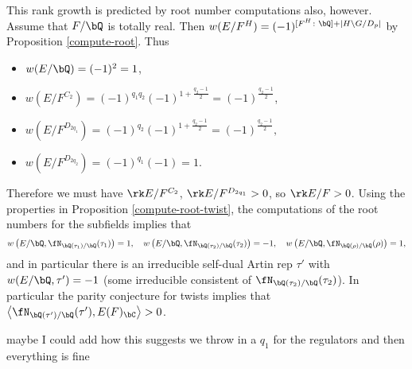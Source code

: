 \begin{example}[Dihedral]
    This rank growth is predicted by root number computations also, however. Assume that $F / \bQ$ is totally real. Then $w(E / F^H) = (-1)^{[F^H \colon \bQ] + | H \backslash G / D_p|}$ by Proposition \ref{compute-root}. Thus
    \begin{itemize}[--]
        \setlength\itemsep{0em}
        \item $w(E / \bQ) = (-1)^2 = 1$,
        \item $w(E / F^{C_2}) = (-1)^{q_1 q_2} (-1)^{1 + \frac{q_2 - 1}{2}} = (-1)^{\frac{q_2 - 1}{2}}$,
        \item $w(E / F^{D_{2 q_1}}) = (-1)^{q_2}(-1)^{1 + \frac{q_2 - 1}{2}} = (-1)^{\frac{q_2 - 1}{2}},$
        \item $w(E / F^{D_{2 q_2}}) = (-1)^{q_1}(-1) = 1$. 
    \end{itemize}
    Therefore we must have $\rk E / F^{C_2}$, $\rk E / F^{D_{2q_1}} > 0$, so $\rk E / F > 0$. 
    Using the properties in Proposition \ref{compute-root-twist}, the computations of the root numbers for the subfields implies that 
    \[ w\left(E / \bQ, \repnorm{\tau_1}\right) = 1, \quad w\left(E / \bQ, \repnorm{\tau_2}\right) = -1, \quad w\left(E / \bQ, \repnorm{\rho}\right) = 1, \]
  and in particular there is an irreducible self-dual Artin rep $\tau'$ with $w(E / \bQ, \tau') = -1$ (some irreducible consistent of $\repnorm{\tau_2}$). In particular the parity conjecture for twists implies that $\left\langle \repnorm{\tau'}, E(F)_{\bC} \right\rangle > 0$. 
    
  
  {\color{red} maybe I could add how this suggests we throw in a $q_1$ for the regulators and then everything is fine }
\end{example}

\begin{example}



\end{example}